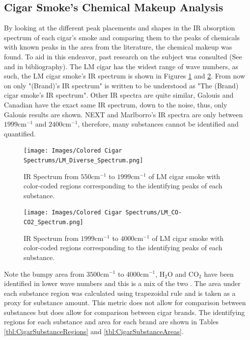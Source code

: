 \documentclass[reprint,amsmath,amssymb,aps, prl]{revtex4-2}
\begin{document}
\subsection{Cigar Smoke's Chemical Makeup Analysis}
By looking at the different peak placements and shapes in the IR absorption spectrum of each cigar's smoke and comparing them to the peaks of chemicals with known peaks in the area from the literature\cite{NISTwebook}, 
the chemical makeup was found. To aid in this endeavor, past research
on the subject was consulted (See \cite{IRCEllSMOKE} and \cite{FTIRSPECTRAOFSMOKE} in bibliography). The LM cigar has the widest range of wave numbers, as such, the LM cigar smoke's IR spectrum is shown in Figures \ref{fig:DiverseLM} and \ref{fig:COCO2LM}. From now on only "(Brand)'s IR spectrum" is written to be understood as "The (Brand) cigar smoke's IR spectrum". Other IR spectra are quite similar, Galouis and Canadian have the exact same IR spectrum, down to the noise, thus, only Galouis results are shown. NEXT and Marlborro's IR spectra are only between $1999\text{cm}^{-1}$ and $2400\text{cm}^{-1}$, therefore, many substances cannot be identified and quantified.
\begin{figure}
    \texttt{[image: Images/Colored Cigar Spectrums/LM\_Diverse\_Spectrum.png]} 
    \caption{IR Spectrum from $550 \text{cm}^{-1}$ to $1999\text{cm}^{-1}$ of LM cigar smoke with color-coded regions corresponding to the identifying peaks of each substance.}
    \label{fig:DiverseLM}
\end{figure}

\begin{figure}
    \texttt{[image: Images/Colored Cigar Spectrums/LM\_CO-CO2\_Spectrum.png]} 
    \caption{IR Spectrum from $1999 \text{cm}^{-1}$ to $4000 \text{cm}^{-1}$ of LM cigar smoke with color-coded regions corresponding to the identifying peaks of each substance.}
    \label{fig:COCO2LM}
\end{figure}
Note the bumpy area from $3500 \text{cm}^{-1}$ to $4000 \text{cm}^{-1}$, $\text{H}_{2}\text{O}$ and $\text{CO}_{2}$ have been identified in lower wave numbers and this is a mix of the two \cite{FTIRSPECTRAOFSMOKE}.
The area under each substance region was calculated using trapezoidal rule \cite{numerical} 
and is taken as a proxy for substance amount. This metric does not allow for comparison between substances but does allow for comparison between cigar brands.
The identifying regions for each substance and area for each brand are shown in Tables \ref{tbl:CigarSubstanceRegions} and \ref{tbl:CigarSubstanceAreas}. %
\end{document}
